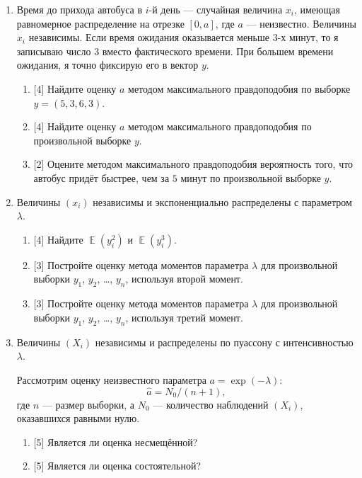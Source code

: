 \documentclass[12pt]{article}
\DeclareMathOperator{\E}{\mathbb{E}}
\begin{document}
\begin{enumerate}
    \item Время до прихода автобуса в $i$-й день — случайная величина $x_i$, имеющая равномерное распределение на отрезке $[0, a]$, где $a$ — неизвестно. 
    Величины $x_i$ независимы. 
    Если время ожидания оказывается меньше $3$-х минут, то я записываю число $3$ вместо фактического времени. 
    При большем времени ожидания, я точно фиксирую его в вектор $y$.

    
    \begin{enumerate}
      \item {[4]} Найдите оценку $a$ методом максимального правдоподобия по выборке $y = (5, 3, 6, 3)$.
      \item {[4]} Найдите оценку $a$ методом максимального правдоподобия по 
      произвольной выборке $y$. 
      \item {[2]} Оцените методом максимального правдоподобия вероятность того, что автобус придёт быстрее, чем за $5$ минут по произвольной выборке  $y$.
    \end{enumerate}
    
    
    \item Величины $(x_i)$ независимы и экспоненциально распределены с параметром $\lambda$.

    \begin{enumerate}
        \item {[4]} Найдите $\E(y_i^2)$ и $\E(y_i^3)$.
        \item {[3]} Постройте оценку метода моментов параметра $\lambda$ для произвольной выборки $y_1$, $y_2$, \dots, $y_n$, 
используя второй момент. 
\item {[3]} Постройте оценку метода моментов параметра $\lambda$ для произвольной выборки $y_1$, $y_2$, \dots, $y_n$, 
используя третий момент. 
    \end{enumerate}

    \item Величины $(X_i)$ независимы и распределены по пуассону с интенсивностью $\lambda$.
    
    Рассмотрим оценку неизвестного параметра $a = \exp(-\lambda)$:
    \[
 \hat a = N_0/ (n + 1),
    \]
    где $n$ — размер выборки, а $N_0$ — количество наблюдений $(X_i)$, оказавшихся равными нулю. 

    \begin{enumerate}
        \item {[5]} Является ли оценка несмещённой?
        \item {[5]} Является ли оценка состоятельной?
    \end{enumerate}


\end{enumerate}
\end{document}
